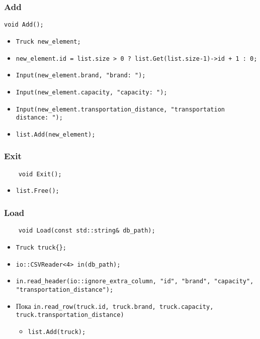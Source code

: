 \subsubsection*{Add}

\begin{lstlisting}
void Add();
\end{lstlisting}

\begin{itemize}
	\item \verb|Truck new_element;|
	\item \verb|new_element.id = list.size > 0 ? list.Get(list.size-1)->id + 1 : 0;|
	\item \verb|Input(new_element.brand, "brand: ");|
	\item \verb|Input(new_element.capacity, "capacity: ");|
	\item \verb|Input(new_element.transportation_distance, "transportation distance: ");|
	\item \verb|list.Add(new_element);|
\end{itemize}


\subsubsection*{Exit}

\begin{lstlisting}
	void Exit();
\end{lstlisting}

\begin{itemize}
	\item \verb|list.Free();|
\end{itemize}


\subsubsection*{Load}

\begin{lstlisting}
	void Load(const std::string& db_path);
\end{lstlisting}

\begin{itemize}
	\item \verb|Truck truck{};|
	\item \verb|io::CSVReader<4> in(db_path);|
	\item \verb|in.read_header(io::ignore_extra_column, "id", "brand", "capacity", "transportation_distance");|
	\item Пока \verb|in.read_row(truck.id, truck.brand, truck.capacity, truck.transportation_distance)|
	\begin{itemize}
		\item \verb|list.Add(truck);|
	\end{itemize}
\end{itemize}



